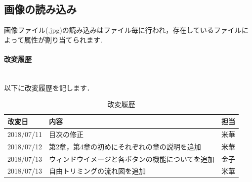 \documentclass[12pt]{jsreport}
\begin{document}
\subsection{画像の読み込み}
画像ファイル(.jpg)の読み込みはファイル毎に行われ，存在しているファイルによって属性が割り当てられます.





\newpage
\paragraph{改変履歴} \\
以下に改変履歴を記します．
\begin{table}[htb]
\caption{改変履歴}
\begin{center}
\begin{tabular}{|l|l|l|}
    \hline
    改変日 & 内容 & 担当 \\ \hline
    2018/07/11 & 目次の修正 & 米華 \\ \hline
    2018/07/12 & 第2章，第4章の初めにそれぞれの章の説明を追加 & 米華 \\ \hline
    2018/07/13 & ウィンドウイメージと各ボタンの機能についてを追加 & 金子 \\ \hline
    2018/07/13 & 自由トリミングの流れ図を追加 & 米華 \\ \hline
\end{tabular}
\end{center}
\end{table}
\end{document}
